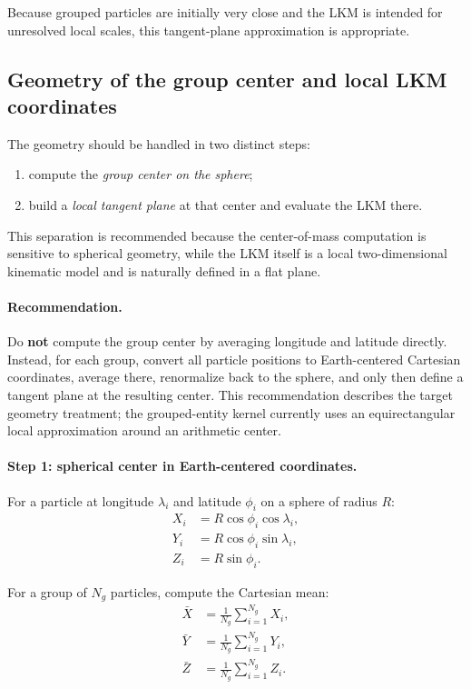 \documentclass[11pt,a4paper]{article}
\begin{document}
	Because grouped particles are initially very close and the LKM is intended for unresolved local scales, this tangent-plane approximation is appropriate.
	
	
	
	
	\subsection{Geometry of the group center and local LKM coordinates}
	
	The geometry should be handled in two distinct steps:
	
	\begin{enumerate}
		\item compute the \emph{group center on the sphere};
		\item build a \emph{local tangent plane} at that center and evaluate the LKM there.
	\end{enumerate}
	
	This separation is recommended because the center-of-mass computation is sensitive to spherical geometry, while the LKM itself is a local two-dimensional kinematic model and is naturally defined in a flat plane.
	
	\paragraph{Recommendation.}
	Do \textbf{not} compute the group center by averaging longitude and latitude directly. Instead, for each group, convert all particle positions to Earth-centered Cartesian coordinates, average there, renormalize back to the sphere, and only then define a tangent plane at the resulting center.
	This recommendation describes the target geometry treatment; the grouped-entity kernel currently uses an equirectangular local approximation around an arithmetic center.
	
	\paragraph{Step 1: spherical center in Earth-centered coordinates.}
	For a particle at longitude $\lambda_i$ and latitude $\phi_i$ on a sphere of radius $R$:
	\begin{align}
		X_i &= R \cos\phi_i \cos\lambda_i, \\
		Y_i &= R \cos\phi_i \sin\lambda_i, \\
		Z_i &= R \sin\phi_i.
	\end{align}
	
	For a group of $N_g$ particles, compute the Cartesian mean:
	\begin{align}
		\bar X &= \frac{1}{N_g}\sum_{i=1}^{N_g} X_i, \\
		\bar Y &= \frac{1}{N_g}\sum_{i=1}^{N_g} Y_i, \\
		\bar Z &= \frac{1}{N_g}\sum_{i=1}^{N_g} Z_i.
	\end{align}
	
\end{document}
